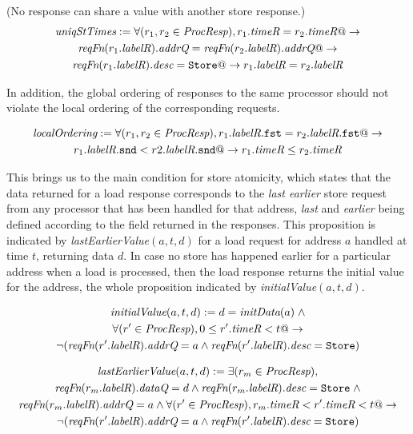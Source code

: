 \begin{defn} (No response can share a \timeR{} value with another store response.)
\small
\begin{multline*}
\textit{uniqStTimes} := 
\forall (r_1, r_2 \in \textit{ProcResp}),
r_1.\textit{timeR} = r_2.\textit{timeR} @-> \\
\textit{reqFn} (r_1.\textit{labelR}).\textit{addrQ} = \textit{reqFn} (r_2.\textit{labelR}).\textit{addrQ} @->\\
\textit{reqFn} (r_1.\textit{labelR}).\textit{desc} = \texttt{Store} @->
r_1.\textit{labelR} = r_2.\textit{labelR}
\end{multline*}
\label{uniqStTimes}
\end{defn}

In addition, the global ordering of responses to the same processor should not
violate the local ordering of the corresponding requests.

\begin{defn}
\small
\begin{multline*}
\textit{localOrdering} :=
\forall (r_1, r_2 \in \textit{ProcResp}), r_1.\textit{labelR}.\texttt{fst} = r_2.\textit{labelR}.\texttt{fst} @->\\
r_1.\textit{labelR}.\texttt{snd} < r2.\textit{labelR}.\texttt{snd} @-> r_1.\textit{timeR} \le r_2.\textit{timeR}
\end{multline*}
\label{localOrdering}
\end{defn}

This brings us to the main condition for store atomicity, which states that the
data returned for a load response corresponds to the \emph{last earlier} store
request from any processor that has been handled for that address,
\emph{last} and \emph{earlier} being defined according to the field \timeR{}
returned in the responses.  This proposition is indicated by
\textit{lastEarlierValue}$(a, t, d)$ for a load request for address $a$ handled
at time $t$, returning data $d$.  In case no store has happened earlier for a
particular address when a load is processed, then the load response returns the
initial value for the address, the whole proposition indicated by
\textit{initialValue}$(a, t, d)$.
\begin{defn}
\small
\begin{multline*}
\textit{initialValue}(a, t, d) := d = \textit{initData} (a) \; \wedge \\
\forall (r' \in \textit{ProcResp}), 0 \le r'.\textit{timeR} < t @->\\
\neg (\textit{reqFn} (r'.\textit{labelR}).\textit{addrQ} = a \wedge \textit{reqFn} (r'.\textit{labelR}).\textit{desc} = \texttt{Store})
\end{multline*}
\label{initialValue}
\end{defn}

\begin{defn}
\small
\begin{multline*}
\textit{lastEarlierValue}(a, t, d) := \exists (r_m \in \textit{ProcResp}),\\ \textit{reqFn} (r_m.\textit{labelR}).\textit{dataQ} = d \wedge 
\textit{reqFn} (r_m.\textit{labelR}).\textit{desc} = \texttt{Store} \; \wedge\\ \textit{reqFn} (r_m.\textit{labelR}).\textit{addrQ} = a \wedge
\forall (r' \in \textit{ProcResp}), r_m.\textit{timeR} < r'.\textit{timeR} < t @->\\
\neg (\textit{reqFn} (r'.\textit{labelR}).\textit{addrQ} = a \wedge \textit{reqFn} (r'.\textit{labelR}).\textit{desc} = \texttt{Store})
\end{multline*}
\label{lastEarlierValue}
\end{defn}

